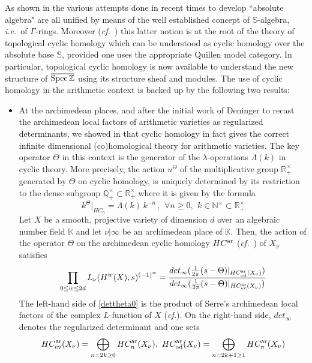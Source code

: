 \documentclass[12pt]{article}
\def\qqq{\,,\quad~\forall}
\def\Spec{{\rm Spec\,}}
\def\K{{\mathbb K}}
\def\N{{\mathbb N}}
\def\Q{{\mathbb Q}}
\def\R{{\mathbb R}}
\def\Z{{\mathbb Z}}
\newcommand{\har}{HC^{\rm ar}}
\def\qqq{\,,\,~\forall}
\newcommand{\ie}{{\it i.e.\/}\ }
\newcommand{\cf}{{\it cf.}}
\newcommand{\cff}{{\it cf.}~}
\def\sss{{\mathbb  S}}
\begin{document}
As shown in \cite{CCsalg} the various attempts done in recent times to develop  ``absolute algebra" are all unified by means of  the well established concept of $\sss$-algebra, \ie of $\Gamma$-rings.  Moreover (\cff\cite{DGM}) this latter notion is at the root of  the theory of topological cyclic homology which can be understood as cyclic homology over the absolute base $\sss$, provided one uses the appropriate Quillen model category. In particular, topological cyclic homology is now available to understand the new structure of $\overline{\Spec\Z}$ using its structure sheaf and modules. The use of cyclic homology in the arithmetic context is backed up by the following two results:
\begin{itemize}
\item  At the archimedean places, and after the initial work of Deninger  \cite{Den1,Den2} to recast the archimedean local factors of arithmetic varieties \cite{Se3} as regularized determinants,  we showed in  \cite{CC6} that cyclic homology in fact gives the correct infinite dimensional (co)homological theory for arithmetic varieties. The key operator $\Theta$ in this context is  the generator of the $\lambda$-operations $\Lambda(k)$ \cite{Loday,weibel,Weibelcris} in cyclic theory.
 More precisely, the action $u^\Theta$ of the multiplicative group $\R_+^\times$ generated by $\Theta$ on cyclic homology, is uniquely determined by its restriction to the dense subgroup $\Q_+^\times\subset \R_+^\times$ where it is  given by the formula
\begin{equation}\label{actiontheta}
    k^\Theta|_{HC_n}=\Lambda(k)\,k^{-n} \qqq n\geq 0, \,  \ k\in \N^\times\subset \R_+^\times
\end{equation}
 Let $X$ be a smooth, projective variety of dimension $d$ over an algebraic number field $\K$ and let $\nu\vert\infty$ be an archimedean place of $\K$.
Then, the action of the operator $\Theta$ on the archimedean cyclic homology $\har$ (\cff\cite{CC6}) of $X_\nu$ satisfies 
\begin{equation}\label{dettheta0}
    \prod_{0\leq w \leq 2d} L_\nu(H^w(X),s)^{(-1)^{w}}=\frac{det_\infty(\frac{1}{2\pi}(s-\Theta)|_{\har_{\rm od}(X_\nu)})}{
    det_\infty(\frac{1}{2\pi}(s-\Theta)|_{\har_{\rm ev}(X_\nu)})}
\end{equation}
The left-hand side of \eqref{dettheta0} is the product of Serre's archimedean local factors of the complex $L$-function of $X$ (\cf\cite{Se3}). On the right-hand side, $det_\infty$ denotes the regularized determinant  and one sets $$\har_{\rm ev}(X_\nu)=\bigoplus_{n=2k\ge 0} \har_{n}(X_\nu), \  \har_{\rm od}(X_\nu)=\bigoplus_{n=2k+1\ge 1} \har_{n}(X_\nu)$$


\end{itemize}
\end{document}
